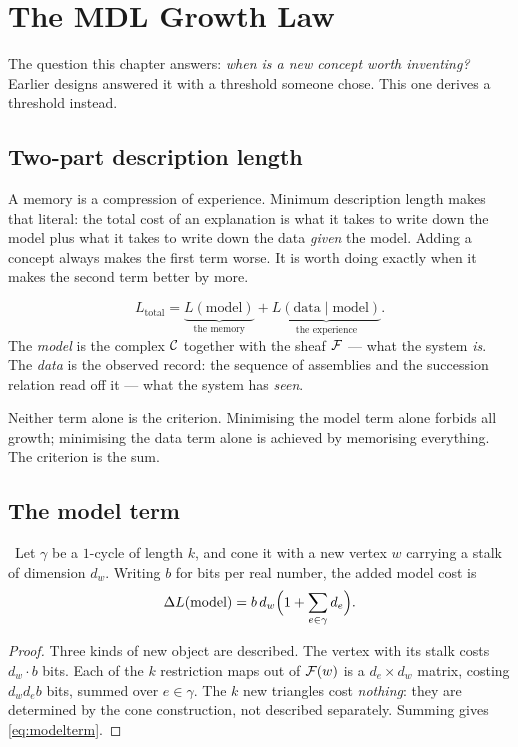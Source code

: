 \chapter{The MDL Growth Law}\label{ch:mdl}

The question this chapter answers: \emph{when is a new concept worth
inventing?} Earlier designs answered it with a threshold someone chose.
This one derives a threshold instead.

\section{Two-part description length}

\begin{intu}\Intu
A memory is a compression of experience. Minimum description length
makes that literal: the total cost of an explanation is what it takes to
write down the model plus what it takes to write down the data
\emph{given} the model. Adding a concept always makes the first term
worse. It is worth doing exactly when it makes the second term better by
more.
\end{intu}

\begin{definition}\label{def:mdl}
\[
  L_{\text{total}}
  =\underbrace{L(\text{model})}_{\text{the memory}}
  +\underbrace{L(\text{data}\mid\text{model})}_{\text{the experience}} .
\]
The \emph{model} is the complex $\mathcal{C}$ together with the sheaf $\mathcal{F}$ ---
what the system \emph{is}. The \emph{data} is the observed record: the
sequence of assemblies and the succession relation read off it --- what
the system has \emph{seen}.
\end{definition}

Neither term alone is the criterion. Minimising the model term alone
forbids all growth; minimising the data term alone is achieved by
memorising everything. The criterion is the sum.

\section{The model term}

\begin{proposition}\label{prop:modelterm}
\Proved\ Let $\gamma$ be a $1$-cycle of length $k$, and cone it with a
new vertex $w$ carrying a stalk of dimension $d_w$. Writing $b$ for bits
per real number, the added model cost is
\begin{equation}\label{eq:modelterm}
  \Delta L(\text{model})
  =b\,d_w\Bigl(1+\sum_{e\in\gamma}d_e\Bigr).
\end{equation}
\end{proposition}
\begin{proof}
Three kinds of new object are described. The vertex with its stalk costs
$d_w\cdot b$ bits. Each of the $k$ restriction maps out of $\mathcal{F}(w)$
is a $d_e\times d_w$ matrix, costing $d_w d_e b$ bits, summed over
$e\in\gamma$. The $k$ new triangles cost \emph{nothing}: they are
determined by the cone construction, not described separately. Summing
gives \eqref{eq:modelterm}.
\end{proof}

